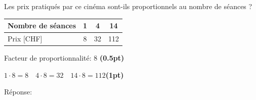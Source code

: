 
\question[2]
Les prix pratiqués par ce cinéma sont-ils proportionnels au nombre de séances ?

\def\arraystretch{1.5}
\begin{center}\begin{tabularx}{0.5\textwidth}{l|C|C|C|}
Nombre de séances &1&4&14\\
\hline
Prix [CHF]&8&32&112\\
\end{tabularx}\end{center}
\def\arraystretch{1.5}

\vspace{10pt}{\footnotesize\raggedleft Espace pour ta démarche et tes calculs\par}
\begin{solutionorgrid}[140pt]

\vspace{5pt}Facteur de proportionnalité: 8 \hfill\textbf{(0.5pt)}

\vspace{5pt}$1 \cdot 8 = 8 \quad 4 \cdot 8 = 32 \quad 14 \cdot 8 = 112$\hfill\textbf{(1pt)}
\end{solutionorgrid}

\begin{tcolorbox}[enhanced jigsaw, interior hidden, colframe=box, parbox=false]%
Réponse: 
\end{tcolorbox}


